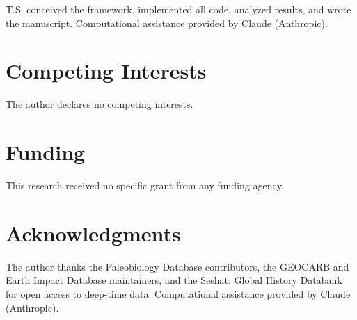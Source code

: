 \documentclass[10pt,letterpaper]{article}
\begin{document}
T.S. conceived the framework, implemented all code, analyzed results,
and wrote the manuscript. Computational assistance provided by Claude
(Anthropic).

\section*{Competing Interests}

The author declares no competing interests.

\section*{Funding}

This research received no specific grant from any funding agency.

\section*{Acknowledgments}

The author thanks the Paleobiology Database contributors, the GEOCARB and
Earth Impact Database maintainers, and the Seshat: Global History Databank
for open access to deep-time data. Computational assistance provided by
Claude (Anthropic).
\end{document}
